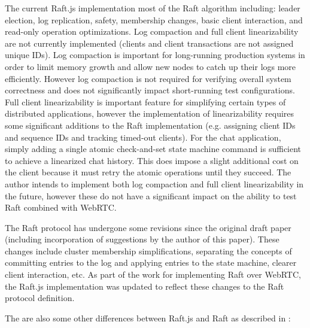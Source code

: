 \documentclass[9pt]{extarticle}
\begin{document}
\begin{multicols}{2}
The current Raft.js implementation most of the Raft algorithm
including: leader election, log replication, safety, membership
changes, basic client interaction, and read-only operation
optimizations. %
Log compaction and full client linearizability are not currently
implemented (clients and client transactions are not assigned unique
IDs). Log compaction is important for long-running production systems
in order to limit memory growth and allow new nodes to catch up their
logs more efficiently. However log compaction is not required for
verifying overall system correctness and does not significantly impact
short-running test configurations. Full client linearizability is
important feature for simplifying certain types of distributed
applications, however the implementation of linearizability requires
some significant additions to the Raft implementation (e.g. assigning
client IDs and sequence IDs and tracking timed-out clients). For the
chat application, simply adding a single atomic check-and-set state
machine command is sufficient to achieve a linearized chat history.
This does impose a slight additional cost on the client because it
must retry the atomic operations until they succeed. The author
intends to implement both log compaction and full client
linearizability in the future, however these do not have a significant
impact on the ability to test Raft combined with WebRTC.

The Raft protocol has undergone some revisions since the original
draft paper \cite{raft_paper:ongaro14} (including incorporation of
suggestions by the author of this paper). These changes include
cluster membership simplifications, separating the concepts of
committing entries to the log and applying entries to the state
machine, clearer client interaction, etc. As part of the work for
implementing Raft over WebRTC, the Raft.js implementation was updated
to reflect these changes to the Raft protocol definition.

The are also some other differences between Raft.js and Raft as
described in \cite[Consensus:~Diego]{raft_thesis:ongaro14}:


\end{multicols}
\end{document}
